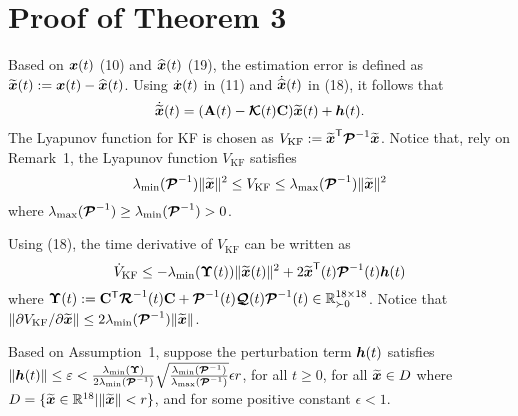 \documentclass[journal,onecolumn]{IEEEtran}
\newtheorem{theorem}{Theorem}
\begin{document}
\section{Proof of Theorem 3}\label{sec:x_tilde}
%
Based on $\boldsymbol{x}(t)$ (10) and $\widehat{\boldsymbol{x}}(t)$ (19), the estimation error is defined as $\widetilde{\boldsymbol{x}}(t):=\boldsymbol{x}(t)-\widehat{\boldsymbol{x}}(t)$.
%
%
Using $\dot{{\boldsymbol{x}}}(t)$ in (11) and $\dot{\widehat{\boldsymbol{x}}}(t)$ in (18), it follows that
%
\begin{equation}
	\dot{\widetilde{\boldsymbol{x}}}(t)=({\bf A}(t)-\boldsymbol{\mathcal{K}} (t){\bf C})\widetilde{\boldsymbol{x}}(t) +\boldsymbol{h}(t).
\end{equation}
%
The Lyapunov function for KF is chosen as $V_{\text{KF}}:=\widetilde{\boldsymbol{x}}^\mathsf{T}\boldsymbol{\mathcal{P}}^{-1}\widetilde{\boldsymbol{x}}$. 
Notice that, rely on Remark~1, the Lyapunov function $V_{\text{KF}}$ satisfies 
%
\begin{equation}
	\lambda_{\min}(\boldsymbol{\mathcal{P}}^{-1})\|\widetilde{\boldsymbol{x}}\|^2 \leq V_{\text{KF}} \leq \lambda_{\max}(\boldsymbol{\mathcal{P}}^{-1})\|\widetilde{\boldsymbol{x}}\|^2
\end{equation}
%
where $\lambda_{\max}(\boldsymbol{\mathcal{P}}^{-1})\geq\lambda_{\min}(\boldsymbol{\mathcal{P}}^{-1})>0$.

Using (18), the time derivative of $V_{\text{KF}}$ can be written as
%
\begin{equation}
	\dot{V}_{\text{KF}}\leq-\lambda_{\min}(\boldsymbol{\Upsilon}(t))\|\widetilde{\boldsymbol{x}}(t)\|^2+2\widetilde{\boldsymbol{x}}^\mathsf{T}(t)\boldsymbol{\mathcal{P}}^{-1}(t)\boldsymbol{h}(t)
\end{equation}
% 
where $\boldsymbol{\Upsilon}(t):={\mathbf C}^\mathsf{T} \boldsymbol{\mathcal{R}} ^{-1}(t){\mathbf C}+\boldsymbol{\mathcal{P}}^{-1}(t)\boldsymbol{\mathcal{Q}} (t)\boldsymbol{\mathcal{P}}^{-1}(t)\in\mathbb{R}^{18\times18}_{\succ0}$.
Notice that $\|\partial V_{\text{KF}}/\partial \widetilde{\boldsymbol{x}}\|\leq 2\lambda_{\min}(\boldsymbol{\mathcal{P}}^{-1})\|\widetilde{\boldsymbol{x}}\|$.

Based on Assumption~1, suppose the perturbation term $\boldsymbol{h}(t)$ satisfies $\|\boldsymbol{h}(t)\| \leq \varepsilon <\frac{\lambda_{\min}(\boldsymbol{\Upsilon})}{2\lambda_{\min}(\boldsymbol{\mathcal{P}}^{-1})}\sqrt{\frac{\lambda_{\min}(\boldsymbol{\mathcal{P}}^{-1})}{\lambda_{\max}(\boldsymbol{\mathcal{P}}^{-1})}}\epsilon r$, for all $t\geq0$, for all $\widetilde{\boldsymbol{x}}\in D$ where $D=\{ \widetilde{\boldsymbol{x}}\in\mathbb{R}^{18}| \|\widetilde{\boldsymbol{x}}\|<r \}$, and for some positive constant $\epsilon<1$.
\end{document}
